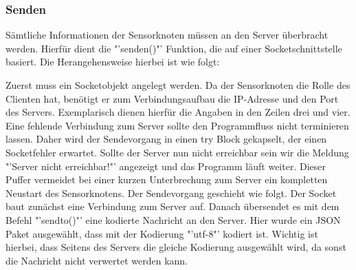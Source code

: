 \subsubsection*{Senden}\label{Sensorknoten:Senden}
	Sämtliche Informationen der Sensorknoten müssen an den Server überbracht werden. Hierfür dient die "'senden()"' Funktion, die auf einer Socketschnittstelle basiert. Die Herangehensweise hierbei ist wie folgt:
	
	Zuerst muss ein Socketobjekt angelegt werden. Da der Sensorknoten die Rolle des Clienten hat, benötigt er zum Verbindungsaufbau die IP-Adresse und den Port des Servers. Exemplarisch dienen hierfür die Angaben in den Zeilen drei und vier. Eine fehlende Verbindung zum Server sollte den Programmfluss nicht terminieren lassen. Daher wird der Sendevorgang in einen try Block gekapselt, der einen Socketfehler erwartet. Sollte der Server nun nicht erreichbar sein wir die Meldung "'Server nicht erreichbar!"' angezeigt und das Programm läuft weiter. Dieser Puffer vermeidet bei einer kurzen Unterbrechung zum Server ein kompletten Neustart des Sensorknotens. Der Sendevorgang geschieht wie folgt. Der Socket baut zunächst eine Verbindung zum Server auf. Danach übersendet es mit dem Befehl "'sendto()"' eine kodierte Nachricht an den Server. Hier wurde ein JSON Paket ausgewählt, dass mit der Kodierung "'utf-8"' kodiert ist. Wichtig ist hierbei, dass Seitens des Servers die gleiche Kodierung ausgewählt wird, da sonst die Nachricht nicht verwertet werden kann. 
